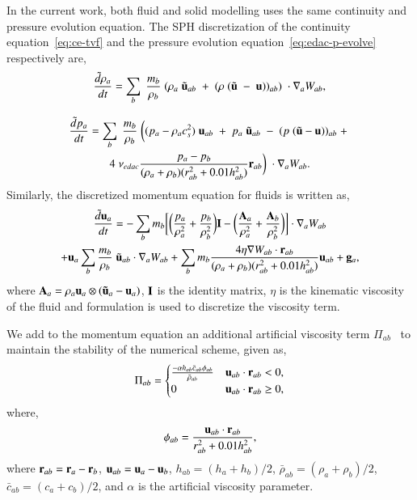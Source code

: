 In the current work, both fluid and solid modelling uses the same continuity
and pressure evolution equation. The SPH discretization of the continuity
equation~\eqref{eq:ce-tvf} and the pressure evolution
equation~\eqref{eq:edac-p-evolve} respectively are,
\begin{equation}
  \label{eq:sph-discretization-continuity}
  \frac{\tilde{d}\rho_a}{dt} = \sum_{b} \; \frac{m_b}{\rho_{b}} \; (
  \rho_{a} \; \tilde{\mathbf{u}}_{ab} \; + \;
  (\rho \; (\tilde{\mathbf{u}} \; - \;
  \mathbf{u}))_{ab}) \; \cdot \nabla_{a} W_{ab},
\end{equation}

\begin{multline}
  \label{eq:sph-discretization-edac}
  \frac{\tilde{d}p_a}{dt} = \sum_{b} \; \frac{m_b}{\rho_{b}} \; \bigg(
  (p_{a} - \rho_{a} c_{s}^2) \; \mathbf{u}_{ab} \; + \;
  p_{a} \; \tilde{\mathbf{u}}_{ab} \; - \;
  (p \; (\tilde{\mathbf{u}} - \mathbf{u}))_{ab} \; + \; \\
  4 \; \nu_{edac}
  \frac{p_a - p_b}{(\rho_a + \rho_b) (r^2_{ab} + 0.01 h_{ab}^{2})} \mathbf{r}_{ab}
  \bigg) \; \cdot \nabla_{a} W_{ab}.
\end{multline}
%
Similarly, the discretized momentum equation for fluids is written as,
\begin{multline}
  \label{eq:sph-momentum-fluid}
  \frac{\tilde{d}\mathbf{u}_{a}}{dt} = - \sum_{b} m_b \bigg[
  \bigg(\frac{p_a}{\rho_a^2} + \frac{p_b}{\rho_b^2}\bigg) \mathbf{I} -
  \bigg(\frac{\mathbf{A}_a}{\rho_a^2} + \frac{\mathbf{A}_b}{\rho_b^2}
  \bigg) \bigg]
  \cdot \nabla_{a} W_{ab} \\
  + \mathbf{u}_{a} \sum_{b} \frac{m_b}{\rho_{b}} \; \tilde{\mathbf{u}}_{ab} \cdot
  \nabla_{a} W_{ab} + \sum_{b} m_b \frac{4 \eta \nabla W_{ab}\cdot
    \mathbf{r}_{ab}}{(\rho_a + \rho_b) (r_{ab}^2 + 0.01 h_{ab}^2)} \mathbf{u}_{ab} +
  \mathbf{g}_{a},
\end{multline}
where $\mathbf{A}_a = \rho_a \mathbf{u}_a \otimes (\mathbf{\tilde{u}}_a - \mathbf{u}_a)$,
$\mathbf{I}$ is the identity matrix, $\eta$ is the kinematic viscosity of the
fluid and \cite{morris1997modeling} formulation is used to discretize the
viscosity term.

We add to the momentum equation an additional artificial viscosity term
$\Pi_{ab}$~\citep{monaghan-review:2005} to maintain the stability of the
numerical scheme, given as,
\begin{align}
  \label{eq:mom-av}
  \Pi_{ab} =
  \begin{cases}
\frac{-\alpha h_{ab} \bar{c}_{ab} \phi_{ab}}{\bar{\rho}_{ab}}
  & \mathbf{u}_{ab}\cdot \mathbf{r}_{ab} < 0, \\
  0 & \mathbf{u}_{ab}\cdot \mathbf{r}_{ab} \ge 0,
\end{cases}
\end{align}
where,
%
\begin{equation}
  \label{eq:av-phiij}
  \phi_{ab} = \frac{\mathbf{u}_{ab} \cdot \mathbf{r}_{ab}}{r^2_{ab} + 0.01 h^2_{ab}},
\end{equation}
%
where $\mathbf{r}_{ab} = \mathbf{r}_a - \mathbf{r}_b$, $\mathbf{u}_{ab} = \mathbf{u}_a -
\mathbf{u}_b$, $h_{ab} = (h_a + h_b)/2$, $\bar{\rho}_{ab} = (\rho_a + \rho_b)/2$,
$\bar{c}_{ab} = (c_a + c_b) / 2$, and $\alpha$ is the artificial
viscosity parameter.

